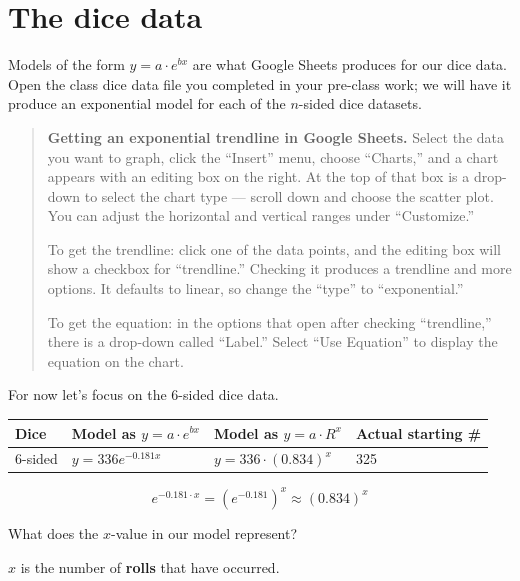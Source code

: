 \documentclass[12pt]{ximera}
\begin{document}
\section*{The dice data}

Models of the form $y = a \cdot e^{bx}$ are what Google Sheets produces for our dice
data. Open the class dice data file you completed in your pre-class work; we will
have it produce an exponential model for each of the $n$-sided dice datasets.

\begin{quote}
\textbf{Getting an exponential trendline in Google Sheets.} Select the data you want
to graph, click the ``Insert'' menu, choose ``Charts,'' and a chart appears with an
editing box on the right. At the top of that box is a drop-down to select the chart
type --- scroll down and choose the scatter plot. You can adjust the horizontal and
vertical ranges under ``Customize.''

To get the trendline: click one of the data points, and the editing box will show a
checkbox for ``trendline.'' Checking it produces a trendline and more options. It
defaults to linear, so change the ``type'' to ``exponential.''

To get the equation: in the options that open after checking ``trendline,'' there is
a drop-down called ``Label.'' Select ``Use Equation'' to display the equation on the
chart.
\end{quote}

For now let's focus on the 6-sided dice data.

\begin{center}
\begin{tabular}{|l|l|l|l|}
\hline
Dice & Model as $y = a \cdot e^{bx}$ & Model as $y = a \cdot R^{x}$ & Actual starting \# \\
\hline
6-sided & $y = 336 e^{-0.181x}$ & $y = 336 \cdot (0.834)^{x}$ & 325 \\
\hline
\end{tabular}
\end{center}

\[
e^{-0.181 \cdot x} = \left(e^{-0.181}\right)^{x} \approx (0.834)^{x}
\]

\begin{problem}
What does the $x$-value in our model represent?
\begin{freeResponse}
\end{freeResponse}
\begin{solution}
$x$ is the number of \textbf{rolls} that have occurred.
\end{solution}
\end{problem}
\end{document}
